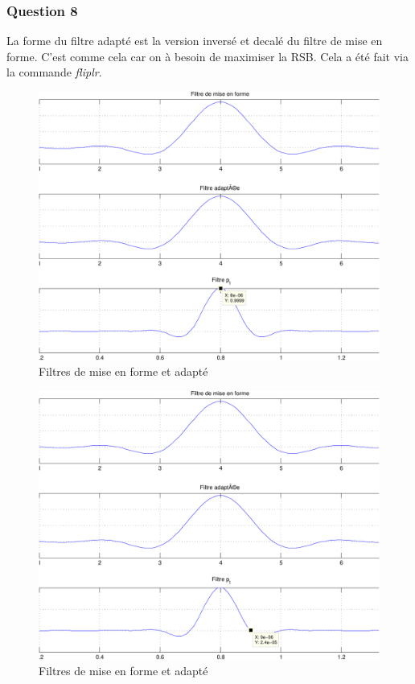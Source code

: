 \documentclass[a4paper,11pt]{article}
\begin{document}
\subsubsection*{Question 8}
La forme du filtre adapté est la version inversé et decalé du filtre de mise en forme. C'est comme cela car on à besoin de maximiser la RSB. Cela a été fait via la commande \emph{fliplr}.
\begin{figure}
	\begin{center}
	\includegraphics[scale=0.5]{Q8-1-crop.pdf}
	\caption{Filtres de mise en forme et adapté}
	\label{fig:ques8-1}
	\end{center}
\end{figure} 
\begin{figure}
	\begin{center}
	\includegraphics[scale=0.5]{Q8-2-crop.pdf}
	\caption{Filtres de mise en forme et adapté}
	\label{fig:ques8-2}
	\end{center}
\end{figure} 
\end{document}
